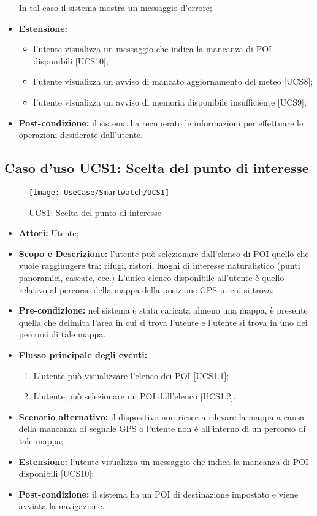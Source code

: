 \begin{itemize}
In tal caso il sistema mostra un messaggio d'errore;
\item \textbf{Estensione:} 
\begin{itemize} 
\item l'utente visualizza un messaggio che indica la mancanza di POI disponibili [UCS10];
\item l'utente visualizza un avviso di mancato aggiornamento del meteo [UCS8];
\item l'utente visualizza un avviso di memoria disponibile insufficiente [UCS9];
\end{itemize}
\item \textbf{Post-condizione:} il sistema ha recuperato le informazioni per effettuare le operazioni desiderate dall'utente.
\end{itemize}

\subsection{Caso d'uso UCS1: Scelta del punto di interesse}

\begin{figure}[H]
\centering
\texttt{[image: UseCase/Smartwatch/UCS1]}
\caption{UCS1: Scelta del punto di interesse}
\end{figure}

\begin{itemize}
\item \textbf{Attori:} Utente;
\item \textbf{Scopo e Descrizione:} l'utente può selezionare dall'elenco di POI quello che vuole raggiungere tra: rifugi, ristori, luoghi di interesse naturalistico (punti panoramici, cascate, ecc.) L'unico elenco disponibile all'utente è quello relativo al percorso della mappa della posizione GPS in cui si trova; 
\item \textbf{Pre-condizione:} nel sistema è stata caricata almeno una mappa, è presente quella che delimita l'area in cui si trova l'utente e l'utente si trova in uno dei percorsi di tale mappa.
\item \textbf{Flusso principale degli eventi:}
\begin{enumerate}
\item L'utente può visualizzare l'elenco dei POI [UCS1.1];
\item L'utente può selezionare un POI dall'elenco [UCS1.2].
\end{enumerate}
\item \textbf{Scenario alternativo:} il dispositivo non riesce a rilevare la mappa a causa della mancanza di segnale GPS o l'utente non è all'interno di un percorso di tale mappa;
\item \textbf{Estensione:} l'utente visualizza un messaggio che indica la mancanza di POI disponibili [UCS10];
\item \textbf{Post-condizione:} il sistema ha un POI di destinazione impostato e viene avviata la navigazione.
\end{itemize}



